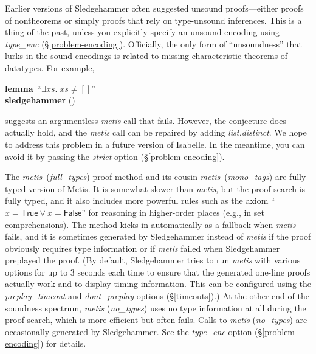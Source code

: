 \documentclass[a4paper,12pt]{article}
\newcommand\const[1]{\textsf{#1}}
\begin{document}

Earlier versions of Sledgehammer often suggested unsound proofs---either proofs
of nontheorems or simply proofs that rely on type-unsound inferences. This
is a thing of the past, unless you explicitly specify an unsound encoding
using \textit{type\_enc} (\S\ref{problem-encoding}).
%
Officially, the only form of ``unsoundness'' that lurks in the sound
encodings is related to missing characteristic theorems of datatypes. For
example,

\prew
\textbf{lemma}~``$\exists \mathit{xs}.\; \mathit{xs} \neq []$'' \\
\textbf{sledgehammer} ()
\postw

suggests an argumentless \textit{metis} call that fails. However, the conjecture
does actually hold, and the \textit{metis} call can be repaired by adding
\textit{list.distinct}.
%
We hope to address this problem in a future version of Isabelle. In the
meantime, you can avoid it by passing the \textit{strict} option
(\S\ref{problem-encoding}).


The \textit{metis}~(\textit{full\_types}) proof method
and its cousin \textit{metis}~(\textit{mono\_tags}) are fully-typed
version of Metis. It is somewhat slower than \textit{metis}, but the proof
search is fully typed, and it also includes more powerful rules such as the
axiom ``$x = \const{True} \mathrel{\lor} x = \const{False}$'' for reasoning in
higher-order places (e.g., in set comprehensions). The method kicks in
automatically as a fallback when \textit{metis} fails, and it is sometimes
generated by Sledgehammer instead of \textit{metis} if the proof obviously
requires type information or if \textit{metis} failed when Sledgehammer
preplayed the proof. (By default, Sledgehammer tries to run \textit{metis} with
various options for up to 3 seconds each time to ensure that the generated
one-line proofs actually work and to display timing information. This can be
configured using the \textit{preplay\_timeout} and \textit{dont\_preplay}
options (\S\ref{timeouts}).)
%
At the other end of the soundness spectrum, \textit{metis} (\textit{no\_types})
uses no type information at all during the proof search, which is more efficient
but often fails. Calls to \textit{metis} (\textit{no\_types}) are occasionally
generated by Sledgehammer.
%
See the \textit{type\_enc} option (\S\ref{problem-encoding}) for details.
\end{document}
